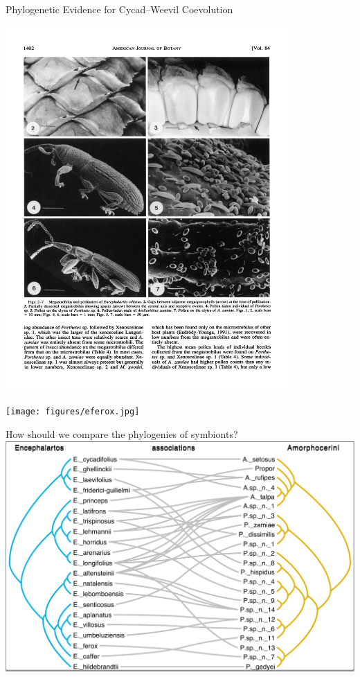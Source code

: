 \documentclass{beamer}
\begin{document}
\begin{frame}{Phylogenetic Evidence for Cycad--Weevil Coevolution}

\centering

\includegraphics[width=0.81\textwidth]{figures/portheteselytra.pdf}

\texttt{[image: figures/eferox.jpg]}

\end{frame}

\begin{frame}{How should we compare the phylogenies of symbionts?}
\pause
\includegraphics[width=\textwidth]{figures/tanglegram.pdf}

\end{frame}
\end{document}
